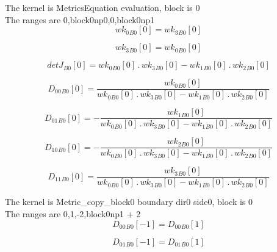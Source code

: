 \documentclass{article}
\begin{document}
\noindent The kernel is MetricsEquation evaluation, block is 0\\\noindent The ranges are 0,block0np0,0,block0np1\\\begin{dmath}{wk_{0}{_{B0}}}[{0}] = {wk_{3}{_{B0}}}[{0}]\end{dmath}

\begin{dmath}{wk_{3}{_{B0}}}[{0}] = {wk_{0}{_{B0}}}[{0}]\end{dmath}

\begin{dmath}{detJ{_{B0}}}[{0}] = {wk_{0}{_{B0}}}[{0}] \,.\, {wk_{3}{_{B0}}}[{0}] - {wk_{1}{_{B0}}}[{0}] \,.\, {wk_{2}{_{B0}}}[{0}]\end{dmath}

\begin{dmath}{D_{00}{_{B0}}}[{0}] = \frac{{wk_{0}{_{B0}}}[{0}]}{{wk_{0}{_{B0}}}[{0}] \,.\, {wk_{3}{_{B0}}}[{0}] - {wk_{1}{_{B0}}}[{0}] \,.\, {wk_{2}{_{B0}}}[{0}]}\end{dmath}

\begin{dmath}{D_{01}{_{B0}}}[{0}] = - \frac{{wk_{1}{_{B0}}}[{0}]}{{wk_{0}{_{B0}}}[{0}] \,.\, {wk_{3}{_{B0}}}[{0}] - {wk_{1}{_{B0}}}[{0}] \,.\, {wk_{2}{_{B0}}}[{0}]}\end{dmath}

\begin{dmath}{D_{10}{_{B0}}}[{0}] = - \frac{{wk_{2}{_{B0}}}[{0}]}{{wk_{0}{_{B0}}}[{0}] \,.\, {wk_{3}{_{B0}}}[{0}] - {wk_{1}{_{B0}}}[{0}] \,.\, {wk_{2}{_{B0}}}[{0}]}\end{dmath}

\begin{dmath}{D_{11}{_{B0}}}[{0}] = \frac{{wk_{3}{_{B0}}}[{0}]}{{wk_{0}{_{B0}}}[{0}] \,.\, {wk_{3}{_{B0}}}[{0}] - {wk_{1}{_{B0}}}[{0}] \,.\, {wk_{2}{_{B0}}}[{0}]}\end{dmath}

\noindent The kernel is Metric_copy_block0 boundary dir0 side0, block is 0\\\noindent The ranges are 0,1,-2,block0np1 + 2\\\begin{dmath}{D_{00}{_{B0}}}[{-1}] = {D_{00}{_{B0}}}[{1}]\end{dmath}

\begin{dmath}{D_{01}{_{B0}}}[{-1}] = {D_{01}{_{B0}}}[{1}]\end{dmath}
\end{document}

